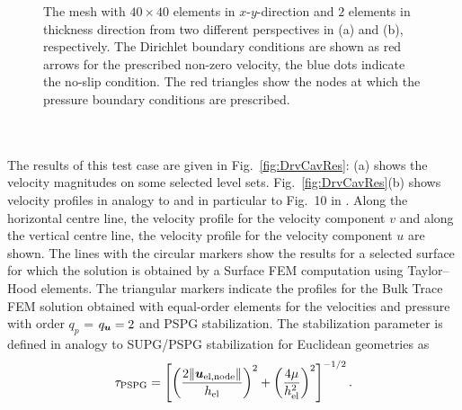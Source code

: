 \documentclass[12pt, twoside, english]{article}
\numberwithin{equation}{section}
\newcommand{\vek}[1]{\mathchoice{\displaystyle\boldsymbol#1}
{\textstyle\boldsymbol#1}{\scriptstyle\boldsymbol#1}
{\scriptscriptstyle\boldsymbol#1}}
\begin{document}
\begin{figure}
	\centering
	
	\hspace{1.5cm}
	
	\caption{\label{fig:DrvCavMeshBCs} The mesh with $40 \times 40$ elements in $x$-$y$-direction and $2$ elements in thickness direction from two different perspectives in (a) and (b), respectively. The Dirichlet boundary conditions are shown as red arrows for the prescribed non-zero velocity, the blue dots indicate the no-slip condition. The red triangles show the nodes at which the pressure boundary conditions are prescribed.}
\end{figure}
\\
\\
The results of this test case are given in Fig.~\ref{fig:DrvCavRes}: (a) shows the velocity magnitudes on some selected level sets. Fig.~\ref{fig:DrvCavRes}(b) shows velocity profiles in analogy to \cite{Ghia_1982a} and in particular to Fig.~10 in \cite{Fries_2018a}. Along the horizontal centre line, the velocity profile for the velocity component $v$ and along the vertical centre line, the velocity profile for the velocity component $u$ are shown. The lines with the circular markers show the results for a selected surface for which the solution is obtained by a Surface FEM computation using Taylor--Hood elements. The triangular markers indicate the profiles for the Bulk Trace FEM solution obtained with equal-order elements for the velocities and pressure with order $q_{p}$ = $q_{\vek{u}} = 2$ and PSPG stabilization. The stabilization parameter is defined in analogy to SUPG/PSPG stabilization for Euclidean geometries \cite{Tezduyar_2003a} as
\begin{equation}
	\tau_{\mathrm{PSPG}} = \left[\left(\frac{2 \lVert \vek{u}_{\mathrm{el,node}}\rVert}{h_\mathrm{el}}\right)^2 + \left(\frac{4\mu}{h_\mathrm{el}^2}\right)^2\right]^{-1/2}. \label{eq:PSPGstabParamStat}
\end{equation}
\end{document}
